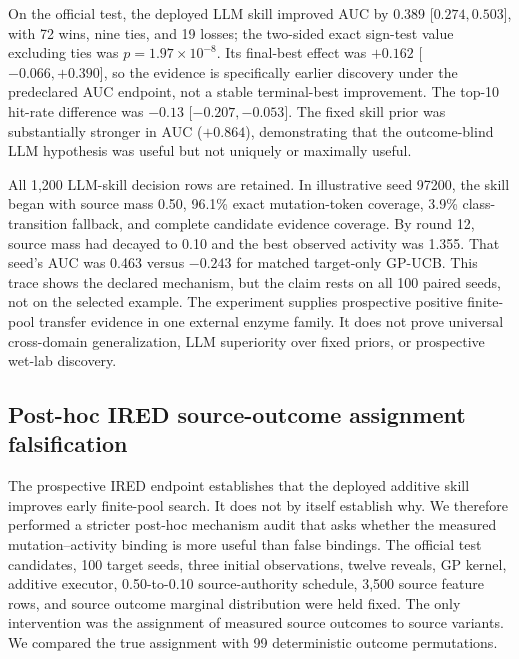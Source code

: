 \documentclass[pdflatex,sn-nature]{sn-jnl}
\begin{document}
\begin{appendices}
On the official test, the deployed LLM skill improved AUC by 0.389
[$0.274,0.503$], with 72 wins, nine ties, and 19 losses; the two-sided exact
sign-test value excluding ties was $p=1.97\times10^{-8}$. Its final-best effect
was $+0.162$ [$-0.066,+0.390$], so the evidence is specifically earlier discovery
under the predeclared AUC endpoint, not a stable terminal-best improvement. The
top-10 hit-rate difference was $-0.13$ [$-0.207,-0.053$]. The fixed skill prior
was substantially stronger in AUC ($+0.864$), demonstrating that the
outcome-blind LLM hypothesis was useful but not uniquely or maximally useful.

All 1,200 LLM-skill decision rows are retained. In illustrative seed 97200, the
skill began with source mass 0.50, 96.1\% exact mutation-token coverage, 3.9\%
class-transition fallback, and complete candidate evidence coverage. By round
12, source mass had decayed to 0.10 and the best observed activity was 1.355.
That seed's AUC was 0.463 versus $-0.243$ for matched target-only GP-UCB. This
trace shows the declared mechanism, but the claim rests on all 100 paired seeds,
not on the selected example. The experiment supplies prospective positive
finite-pool transfer evidence in one external enzyme family. It does not prove
universal cross-domain generalization, LLM superiority over fixed priors, or
prospective wet-lab discovery.

\subsection{Post-hoc IRED source-outcome assignment falsification}
\label{sec:ired_outcome_falsification}

The prospective IRED endpoint establishes that the deployed additive skill
improves early finite-pool search. It does not by itself establish why. We
therefore performed a stricter post-hoc mechanism audit that asks whether the
measured mutation--activity binding is more useful than false bindings. The
official test candidates, 100 target seeds, three initial observations, twelve
reveals, GP kernel, additive executor, 0.50-to-0.10 source-authority schedule,
3,500 source feature rows, and source outcome marginal distribution were held
fixed. The only intervention was the assignment of measured source outcomes to
source variants. We compared the true assignment with 99 deterministic outcome
permutations.


\end{appendices}
\end{document}
